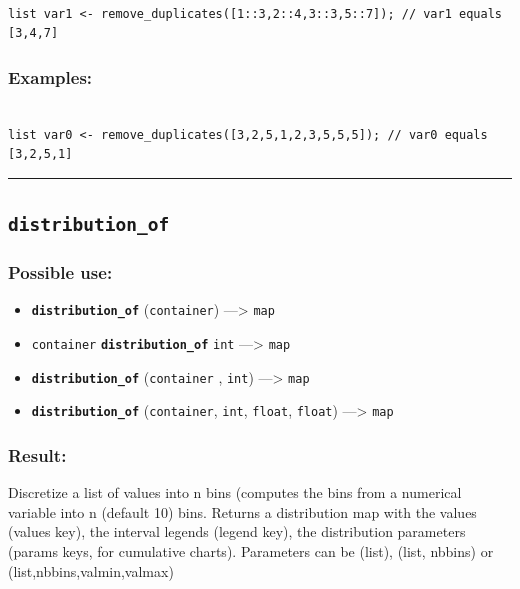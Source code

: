 \documentclass[]{book}
\providecommand{\tightlist}{%
  \setlength{\itemsep}{0pt}\setlength{\parskip}{0pt}}
\theoremstyle{definition}
\theoremstyle{definition}
\theoremstyle{definition}
\theoremstyle{remark}
\begin{document}
\begin{verbatim}
 
list var1 <- remove_duplicates([1::3,2::4,3::3,5::7]); // var1 equals [3,4,7]
\end{verbatim}

\subsubsection{Examples:}\label{examples-104}

\begin{verbatim}
 
list var0 <- remove_duplicates([3,2,5,1,2,3,5,5,5]); // var0 equals [3,2,5,1]
\end{verbatim}

\begin{center}\rule{0.5\linewidth}{\linethickness}\end{center}

\subsection{\texorpdfstring{\texttt{distribution\_of}}{distribution\_of}}\label{distribution_of}

\subsubsection{Possible use:}\label{possible-use-138}

\begin{itemize}
\tightlist
\item
  \textbf{\texttt{distribution\_of}} (\texttt{container})
  ---\textgreater{} \texttt{map}
\item
  \texttt{container} \textbf{\texttt{distribution\_of}} \texttt{int}
  ---\textgreater{} \texttt{map}
\item
  \textbf{\texttt{distribution\_of}} (\texttt{container} , \texttt{int})
  ---\textgreater{} \texttt{map}
\item
  \textbf{\texttt{distribution\_of}} (\texttt{container}, \texttt{int},
  \texttt{float}, \texttt{float}) ---\textgreater{} \texttt{map}
\end{itemize}

\subsubsection{Result:}\label{result-134}

Discretize a list of values into n bins (computes the bins from a
numerical variable into n (default 10) bins. Returns a distribution map
with the values (values key), the interval legends (legend key), the
distribution parameters (params keys, for cumulative charts). Parameters
can be (list), (list, nbbins) or (list,nbbins,valmin,valmax)
\end{document}

